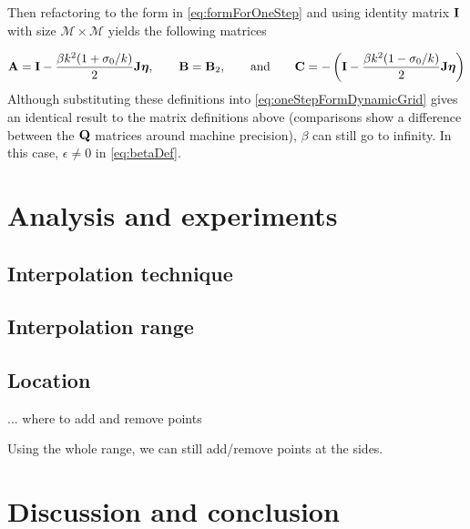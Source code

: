 Then refactoring to the form in \eqref{eq:formForOneStep} and using identity matrix $\mathbf{I}$ with size $\mathcal{M} \times \mathcal{M}$ yields the following matrices

\begin{equation}
    \mathbf{A} = \mathbf{I} - \frac{\beta k^2 (1+\sigma_0/k)}{2}\mathbf{J}\boldsymbol{\eta}, \qquad \mathbf{B} = \mathbf{B}_2, \qquad \text{and} \qquad \mathbf{C} = -\left(\mathbf{I} - \frac{\beta k^2 (1-\sigma_0/k)}{2}\mathbf{J}\boldsymbol{\eta}\right)
\end{equation}
Although substituting these definitions into \eqref{eq:oneStepFormDynamicGrid} gives an identical result to the matrix definitions above (comparisons show a difference between the $\mathbf{Q}$ matrices around machine precision), $\beta$ can still go to infinity. In this case, $\epsilon \neq 0$ in \eqref{eq:betaDef}. 

\section{%
Analysis and experiments}
\subsection{Interpolation technique}
\subsection{Interpolation range}
\subsection{Location}
... where to add and remove points

Using the whole range, we can still add/remove points at the sides. 

\section{Discussion and conclusion}\label{sec:conclusion}